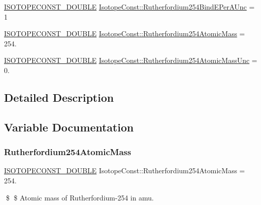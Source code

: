 \begin{DoxyCompactItemize}
\item 
\mbox{\hyperlink{group___isotope_const-_macros_ga8f45a7272ce02c0b4c65c44636ed719a}{I\+S\+O\+T\+O\+P\+E\+C\+O\+N\+S\+T\+\_\+\+D\+O\+U\+B\+LE}} \mbox{\hyperlink{group___isotope_const-_rutherfordium-_rf254_ga48661515b23e6b5ee58fcb64ca0e362a}{Isotope\+Const\+::\+Rutherfordium254\+Bind\+E\+Per\+A\+Unc}} = 1
\item 
\mbox{\hyperlink{group___isotope_const-_macros_ga8f45a7272ce02c0b4c65c44636ed719a}{I\+S\+O\+T\+O\+P\+E\+C\+O\+N\+S\+T\+\_\+\+D\+O\+U\+B\+LE}} \mbox{\hyperlink{group___isotope_const-_rutherfordium-_rf254_ga00e1149fa8d80c15598899d9bbaedd0c}{Isotope\+Const\+::\+Rutherfordium254\+Atomic\+Mass}} = 254.
\item 
\mbox{\hyperlink{group___isotope_const-_macros_ga8f45a7272ce02c0b4c65c44636ed719a}{I\+S\+O\+T\+O\+P\+E\+C\+O\+N\+S\+T\+\_\+\+D\+O\+U\+B\+LE}} \mbox{\hyperlink{group___isotope_const-_rutherfordium-_rf254_ga8321023f76e10e36acff4ba5b636f13b}{Isotope\+Const\+::\+Rutherfordium254\+Atomic\+Mass\+Unc}} = 0.
\end{DoxyCompactItemize}


\subsection{Detailed Description}


\subsection{Variable Documentation}
\mbox{\label{group___isotope_const-_rutherfordium-_rf254_ga00e1149fa8d80c15598899d9bbaedd0c}} 
\subsubsection{\texorpdfstring{Rutherfordium254\+Atomic\+Mass}{Rutherfordium254AtomicMass}}
{\footnotesize\ttfamily \mbox{\hyperlink{group___isotope_const-_macros_ga8f45a7272ce02c0b4c65c44636ed719a}{I\+S\+O\+T\+O\+P\+E\+C\+O\+N\+S\+T\+\_\+\+D\+O\+U\+B\+LE}} Isotope\+Const\+::\+Rutherfordium254\+Atomic\+Mass = 254.}

\$ \$ Atomic mass of Rutherfordium-\/254 in amu. \mbox{\label{group___isotope_const-_rutherfordium-_rf254_ga8321023f76e10e36acff4ba5b636f13b}} 
